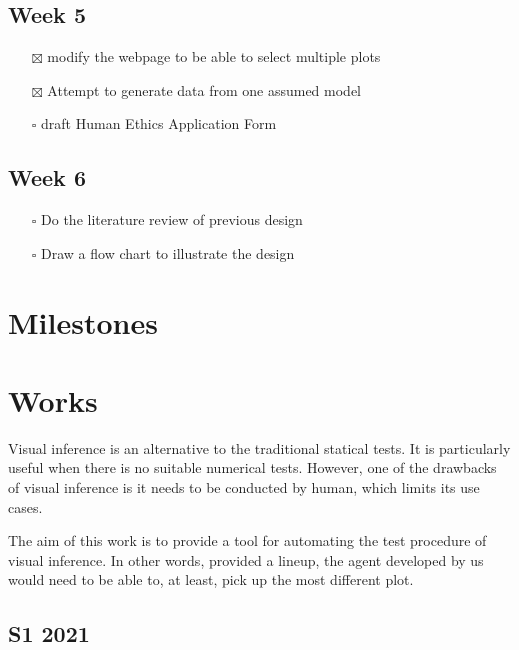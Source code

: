\documentclass[
]{book}
\providecommand{\tightlist}{%
  \setlength{\itemsep}{0pt}\setlength{\parskip}{0pt}}
\begin{document}
\hypertarget{week-5}{%
\section{Week 5}\label{week-5}}

\begin{itemize}
\tightlist
\item[$\boxtimes$]
  modify the webpage to be able to select multiple plots
\item[$\boxtimes$]
  Attempt to generate data from one assumed model
\item[$\square$]
  draft Human Ethics Application Form
\end{itemize}

\hypertarget{week-6}{%
\section{Week 6}\label{week-6}}

\begin{itemize}
\tightlist
\item[$\square$]
  Do the literature review of previous design
\item[$\square$]
  Draw a flow chart to illustrate the design
\end{itemize}

\hypertarget{milestones}{%
\chapter{Milestones}\label{milestones}}

\hypertarget{works}{%
\chapter{Works}\label{works}}

Visual inference is an alternative to the traditional statical tests. It is particularly useful when there is no suitable numerical tests. However, one of the drawbacks of visual inference is it needs to be conducted by human, which limits its use cases.

The aim of this work is to provide a tool for automating the test procedure of visual inference. In other words, provided a lineup, the agent developed by us would need to be able to, at least, pick up the most different plot.

\hypertarget{s1-2021}{%
\section{S1 2021}\label{s1-2021}}
\end{document}

